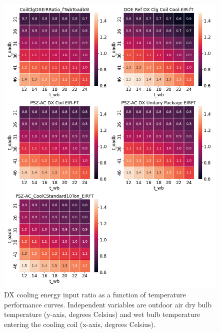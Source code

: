 \begin{figure}
    \centering \includegraphics[width=1.0\textwidth]{figures/EIRFT.png}
    \caption[DX cooling energy input ratio as a function of temperature performance curves]{DX cooling energy input ratio as a function of temperature performance curves. Independent variables are outdoor air dry bulb temperature (y-axis, degrees Celsius) and wet bulb temperature entering the cooling coil (x-axis, degrees Celsius).}
    \label{fig:dx_eirft}
\end{figure}

